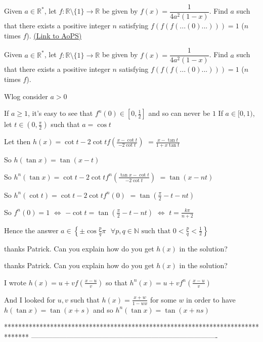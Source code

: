 \begin{problem}
	Given $a\in \mathbb{R}^*$, let $f: \mathbb{R}\setminus \{1\} \to  \mathbb{R}$ be given by $f(x)=\dfrac{1}{4a^2(1-x)}$. Find $a$ such that there exists a positive integer $n$ satisfying $f(f(f(...(0)...)))=1$ ($n$ times $f$).
	\flushright \href{https://artofproblemsolving.com/community/c6h565492}{(Link to AoPS)}
\end{problem}



\begin{solution}
	\begin{tcolorbox}Given $a\in \mathbb{R}^*$, let $f: \mathbb{R}\setminus \{1\} \to  \mathbb{R}$ be given by $f(x)=\dfrac{1}{4a^2(1-x)}$. Find $a$ such that there exists a positive integer $n$ satisfying $f(f(f(...(0)...)))=1$ ($n$ times $f$).\end{tcolorbox}
Wlog consider $a>0$

If $a\ge 1$, it's easy to see that $f^{n}(0)\in[0,\frac 12]$ and so can never be $1$
If $a\in[0,1)$, let $t\in(0,\frac{\pi}2)$ such that $a=\cos t$

Let then $h(x)=\cot t-2\cot tf(\frac{x-\cot t}{-2\cot t})$ $=\frac{x-\tan t}{1+x\tan t}$

So $h(\tan x)=\tan(x-t)$

So $h^{n}(\tan x)=\cot t-2\cot tf^{n}(\frac{\tan x-\cot t}{-2\cot t})$ $=\tan(x-nt)$

So $h^n(\cot t)=\cot t-2\cot tf^{n}(0)$ $=\tan(\frac{\pi}2-t-nt)$

So $f^n(0)=1$ $\iff$ $-\cot t=\tan(\frac{\pi}2-t-nt)$ $\iff$ $t=\frac{k\pi}{n+2}$

Hence the answer $\boxed{a\in\left\{\pm\cos\frac pq\pi\text{    }\forall p,q\in\mathbb N\text{ such that }0<\frac pq<\frac 12\right\}}$
\end{solution}



\begin{solution}
	thanks Patrick. Can you explain how do you get $h(x)$ in the solution?
\end{solution}



\begin{solution}
	\begin{tcolorbox}thanks Patrick. Can you explain how do you get $h(x)$ in the solution?\end{tcolorbox}
I wrote $h(x)=u+vf(\frac {x-u}v)$ so that $h^n(x)=u+vf^n(\frac {x-u}v)$

And I looked for $u,v$ such that $h(x)=\frac {x+w}{1-wx}$ for some $w$  in order to have $h(\tan x)=\tan(x+s)$ and so $h^n(\tan x)=\tan (x+ns)$
\end{solution}
*******************************************************************************
-------------------------------------------------------------------------------


